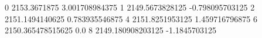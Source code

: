 0 2153.3671875 3.001708984375
1 2149.5673828125 -0.798095703125
2 2151.1494140625 0.783935546875
4 2151.8251953125 1.459716796875
6 2150.365478515625 0.0
8 2149.180908203125 -1.1845703125
